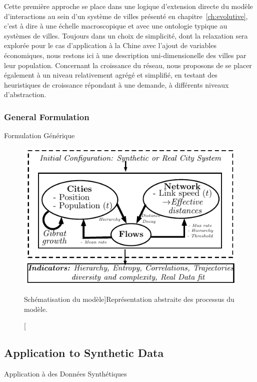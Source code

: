 Cette première approche se place dans une logique d'extension directe du modèle d'interactions au sein d'un système de villes présenté en chapitre~\autoref{ch:evolutive}, c'est à dire à une échelle macroscopique et avec une ontologie typique au systèmes de villes. Toujours dans un choix de simplicité, dont la relaxation sera explorée pour le cas d'application à la Chine avec l'ajout de variables économiques, nous restons ici à une description uni-dimensionelle des villes par leur population. Concernant la croissance du réseau, nous proposons de se placer également à un niveau relativement agrégé et simplifié, en testant des heuristiques de croissance répondant à une demande, à différents niveaux d'abstraction. 







\subsubsection{General Formulation}{Formulation Générique}




\begin{figure}
\centering
\includegraphics[width=\textwidth]{Figures/MacroCoEvolModel/model}
\caption[][Schématisation du modèle]{}{Représentation abstraite des processus du modèle.}
\end{figure}








\subsection{Application to Synthetic Data}{Application à des Données Synthétiques}

